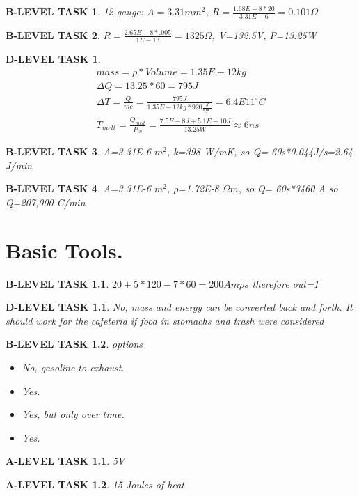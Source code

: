 \documentclass{book}
\numberwithin{equation}{section}
\newtheorem{alevel}{A-LEVEL TASK}
\newtheorem{blevel}{B-LEVEL TASK}
\newtheorem{dlevel}{D-LEVEL TASK}
\theoremstyle{definition}
\begin{document}
\begin{blevel}12-gauge: $A=3.31mm^2$, $R=\frac{1.68E-8*20}{3.31E-6}= 0.101 \Omega$\end{blevel}
\begin{blevel}$R=\frac{2.65E-8*.005}{1E-13}= 1325 \Omega$, V=132.5V, P=13.25W\end{blevel}
\begin{dlevel}
\begin{align*}
mass=\rho*Volume=1.35E-12kg\\
\Delta Q=13.25*60=795J\\
\Delta T=\frac{Q}{mc}=\frac{795J}{1.35E-12kg*920\frac{J}{kgC}}=6.4E11 ^\circ C\\
T_{melt}=\frac{Q_{melt}}{P_{in}}=\frac{7.5E-8J+5.1E-10J}{13.25W}\approx 6ns
\end{align*}
\end{dlevel}
\begin{blevel}A=3.31E-6 $m^2$, k=398 W/mK, so Q= 60s*0.044J/s=2.64 J/min\end{blevel}
\begin{blevel}A=3.31E-6 $m^2$, $\rho$=1.72E-8 $\Omega m$, so Q= 60s*3460 A so Q=207,000 C/min\end{blevel}


\setcounter{alevel}{0} \setcounter{blevel}{0} \setcounter{clevel}{0} \setcounter{dlevel}{0}
\chapter{Basic Tools.}

\begin{blevel}$20+5*120-7*60=200 Amps$ therefore out=1\end{blevel}
\begin{dlevel}No, mass and energy can be converted back and forth. It should work for the cafeteria if food in stomachs and trash were considered\end{dlevel}
\begin{blevel} options
\begin{itemize}
\item No, gasoline to exhaust.
\item Yes.
\item Yes, but only over time.
\item Yes.
\end{itemize}\end{blevel}

\begin{alevel}5V\end{alevel}
\begin{alevel}15 Joules of heat\end{alevel}
\end{document}
